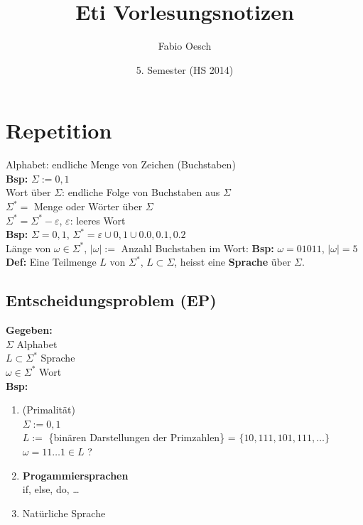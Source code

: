 \documentclass[10pt]{article}
\title{
	\vspace{5cm}
	Eti Vorlesungsnotizen
}
\author{Fabio Oesch}
\date{5. Semester (HS 2014)}
\newcommand{\Bold}[1]{\textbf{#1}} %
\begin{document}
\maketitle
\thispagestyle{fancy}

\newpage

\tableofcontents	  	


\newpage
\setcounter{page}{1}

\section{Repetition}
Alphabet: endliche Menge von Zeichen (Buchstaben)\\
\Bold{Bsp:} $\Sigma:={0,1}$\\
Wort \"uber $\Sigma$: endliche Folge von Buchstaben aus $\Sigma$\\
$\Sigma^*=$ Menge oder W\"orter \"uber $\Sigma$\\
$\Sigma^*=\Sigma^*-{\varepsilon}$, $\varepsilon$: leeres Wort\\
\Bold{Bsp:} $\Sigma={0,1}$, $\Sigma^*={\varepsilon}\cup{0,1}\cup{0.0,0.1,0.2}$\\
L\"ange von $\omega\in\Sigma^*$, $\mid\omega\mid:=$ Anzahl Buchstaben im Wort: \Bold{Bsp:} $\omega=01011$, $\mid\omega\mid=5$\\
\Bold{Def:} Eine Teilmenge $L$ von $\Sigma^*$, $L\subset\Sigma$, heisst eine \Bold{Sprache} \"uber $\Sigma$.
\subsection{Entscheidungsproblem (EP)}
\Bold{Gegeben:}\\ 
$\Sigma$ Alphabet\\
$L\subset\Sigma^*$ Sprache\\
$\omega\in\Sigma^*$ Wort\\
\Bold{Bsp:} 
\begin{enumerate}
 \item (Primalit\"at)\\
 $\Sigma:={0,1}$\\
 $L:=$ \{bin\"aren Darstellungen der Primzahlen\} = $\{10,111,101,111,\dots\}$\\
 $\omega=11\dots1\in L$ ?
 \item \Bold{Progammiersprachen}\\
 if, else, do, \dots
 \item Nat\"urliche Sprache
\end{enumerate}
\end{document}
